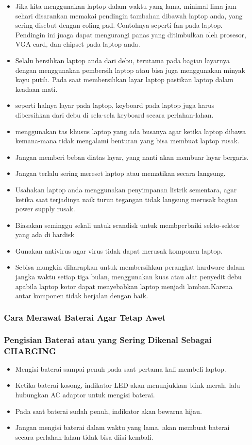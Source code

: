 \begin{itemize}	
	\item{Jika kita menggunakan laptop dalam waktu yang lama, minimal lima jam sehari disarankan memakai pendingin tambahan dibawah 
laptop anda, yang sering disebut dengan coling pad. Contohnya seperti fan pada laptop. Pendingin ini juaga dapat mengurangi panas 
yang ditimbulkan oleh prosesor, VGA card, dan chipset pada laptop anda.}
	\item{Selalu bersihkan laptop anda dari debu, terutama pada bagian layarnya dengan menggunakan pembersih laptop atau bisa juga
menggunakan minyak kayu putih. Pada saat membersihkan layar laptop pastikan laptop dalam keadaan mati.}
	\item{seperti halnya layar pada laptop, keyboard pada laptop juga harus dibersihkan dari debu di sela-sela keyboard secara 
perlahan-lahan.}
	\item{menggunakan tas khusus laptop yang ada busanya agar ketika laptop dibawa kemana-mana tidak mengalami benturan yang bisa
membuat laptop rusak.}
	\item{Jangan memberi beban diatas layar, yang nanti akan membuar layar bergaris.}
	\item{Jangan terlalu sering mereset laptop atau mematikan secara langsung.}
	\item{Usahakan laptop anda menggunakan penyimpanan listrik sementara, agar ketika saat terjadinya naik turun tegangan tidak
langsung merusak bagian power supply rusak.}
	\item{Biasakan seminggu sekali untuk scandisk untuk membperbaiki sekto-sektor yang ada di hardisk}
	\item{Gunakan antivirus agar virus tidak dapat merusak komponen laptop.}
	\item{Sebisa mungkin diharapkan untuk membersihkan perangkat hardware dalam jangka waktu setiap tiga bulan, menggunakan kuas atau
alat penyedit debu apabila laptop kotor dapat menyebabkan laptop menjadi lamban.Karena antar komponen tidak berjalan dengan
baik.}
\end{itemize}

\subsubsection{Cara Merawat Baterai Agar Tetap Awet}
	\subsubsection{Pengisian Baterai atau yang Sering Dikenal Sebagai CHARGING}
	\begin{itemize}
		\item{Mengisi baterai sampai penuh pada saat pertama kali membeli laptop.}
		\item{Ketika baterai kosong, indikator LED akan menunjukkan blink merah, lalu hubungkan AC adaptor untuk mengisi
		baterai.}
		\item{Pada saat baterai sudah penuh, indikator akan bewarna hijau.}
		\item{Jangan mengisi baterai dalam waktu yang lama, akan membuat baterai secara perlahan-lahan tidak bisa diisi kembali.}
	\end{itemize}
